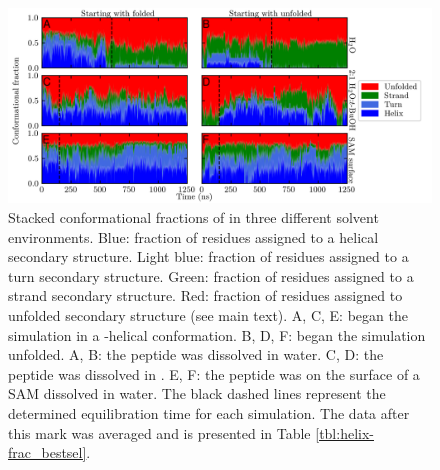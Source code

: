 \begin{figure}
    \center
    \includegraphics[width=\double]{figures-helix/combined_helicity.png}
    \caption{
        Stacked conformational fractions of \pep{} in three different solvent environments. 
        Blue: fraction of residues assigned to a helical secondary structure. 
        Light blue: fraction of residues assigned to a turn secondary structure. 
        Green: fraction of residues assigned to a strand secondary structure. 
        Red: fraction of residues assigned to unfolded secondary structure (see main text). 
        A, C, E: \pep{} began the simulation in a \textalpha{}-helical conformation. 
        B, D, F: \pep{} began the simulation unfolded. 
        A, B: the peptide was dissolved in water. 
        C, D: the peptide was dissolved in \tbawat{}. 
        E, F: the peptide was on the surface of a SAM dissolved in water. 
        The black dashed lines represent the determined equilibration time for each simulation. 
        The data after this mark was averaged and is presented in Table \ref{tbl:helix-frac_bestsel}.
    }
    \label{fig:helix-conf_fracs}
\end{figure}

